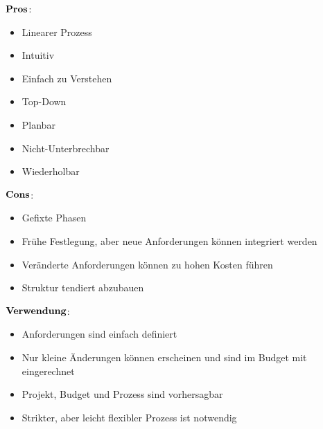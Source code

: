 \begin{multicols}{2}
$\bold{Pros}$:
\begin{itemize}
	\item Linearer Prozess
	\item Intuitiv
	\item Einfach zu Verstehen
	\item Top-Down
	\item Planbar
	\item Nicht-Unterbrechbar
	\item Wiederholbar
\end{itemize}
\columnbreak
$\bold{Cons}$:
\begin{itemize}
	\item Gefixte Phasen
	\item Frühe Festlegung, aber neue Anforderungen können integriert werden
	\item Veränderte Anforderungen können zu hohen Kosten führen
	\item Struktur tendiert abzubauen
\end{itemize}
\end{multicols}
$\bold{Verwendung}$: \newline
\begin{itemize}
	\item Anforderungen sind einfach definiert
	\item Nur kleine Änderungen können erscheinen und sind im Budget mit eingerechnet
	\item Projekt, Budget und Prozess sind vorhersagbar
	\item Strikter, aber leicht flexibler Prozess ist notwendig 
\end{itemize}
